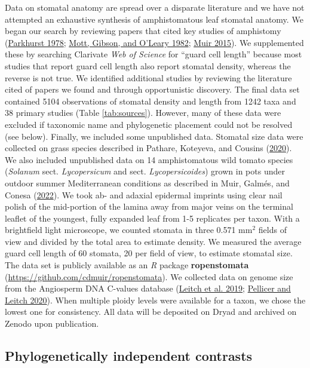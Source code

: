 \documentclass[
  12pt,
]{article}
\begin{document}
Data on stomatal anatomy are spread over a disparate literature and we have not attempted an exhaustive synthesis of amphistomatous leaf stomatal anatomy. We began our search by reviewing papers that cited key studies of amphistomy (\protect\hyperlink{ref-parkhurst_adaptive_1978}{Parkhurst 1978}; \protect\hyperlink{ref-mott_adaptive_1982}{Mott, Gibson, and O'Leary 1982}; \protect\hyperlink{ref-muir_making_2015}{Muir 2015}). We supplemented these by searching Clarivate \emph{Web of Science} for ``guard cell length'' because most studies that report guard cell length also report stomatal density, whereas the reverse is not true. We identified additional studies by reviewing the literature cited of papers we found and through opportunistic discovery. The final data set contained 5104 observations of stomatal density and length from 1242 taxa and 38 primary studies (Table \ref{tab:sources}). However, many of these data were excluded if taxonomic name and phylogenetic placement could not be resolved (see below). Finally, we included some unpublished data. Stomatal size data were collected on grass species described in Pathare, Koteyeva, and Cousins (\protect\hyperlink{ref-pathare_increased_2020}{2020}). We also included unpublished data on 14 amphistomatous wild tomato species (\emph{Solanum} sect. \emph{Lycopersicum} and sect. \emph{Lycopersicoides}) grown in pots under outdoor summer Mediterranean conditions as described in Muir, Galmés, and Conesa (\protect\hyperlink{ref-muir_unpublished_2022}{2022}). We took ab- and adaxial epidermal imprints using clear nail polish of the mid-portion of the lamina away from major veins on the terminal leaflet of the youngest, fully expanded leaf from 1-5 replicates per taxon. With a brightfield light microscope, we counted stomata in three 0.571 mm\(^2\) fields of view and divided by the total area to estimate density. We measured the average guard cell length of 60 stomata, 20 per field of view, to estimate stomatal size. The data set is publicly available as an \emph{R} package \textbf{ropenstomata} (\url{https://github.com/cdmuir/ropenstomata}). We collected data on genome size from the Angiosperm DNA C-values database (\protect\hyperlink{ref-leitch_angiosperm_2019}{Leitch et al. 2019}; \protect\hyperlink{ref-pellicer_plant_2020}{Pellicer and Leitch 2020}). When multiple ploidy levels were available for a taxon, we chose the lowest one for consistency. All data will be deposited on Dryad and archived on Zenodo upon publication.

\hypertarget{phylogenetically-independent-contrasts}{%
\subsection{Phylogenetically independent contrasts}\label{phylogenetically-independent-contrasts}}
\end{document}
